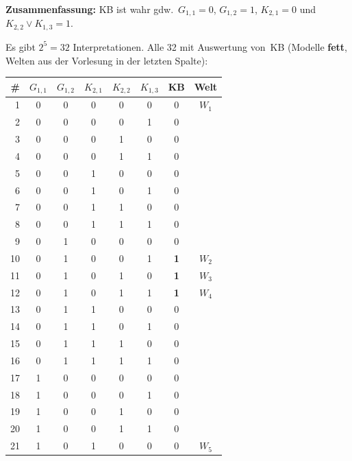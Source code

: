 \documentclass[a4paper,12pt]{article}
\begin{document}
\textbf{Zusammenfassung:} KB ist wahr gdw.\
$G_{1,1}=0$, $G_{1,2}=1$, $K_{2,1}=0$ und $K_{2,2} \vee K_{1,3} = 1$.

\newpage

\noindent{}

\bigskip
Es gibt $2^5 = 32$ Interpretationen.
Alle 32 mit Auswertung von~KB
(Modelle \textbf{fett}, Welten aus der Vorlesung in der letzten Spalte):

\begin{center}
\small
\renewcommand{\arraystretch}{1.05}
\begin{tabular}{r|ccccc|c|c}
\toprule
\# & $G_{1,1}$ & $G_{1,2}$ & $K_{2,1}$ & $K_{2,2}$ & $K_{1,3}$
   & KB & Welt \\
\midrule
1  & 0 & 0 & 0 & 0 & 0 & 0 & $W_1$ \\
2  & 0 & 0 & 0 & 0 & 1 & 0 & \\
3  & 0 & 0 & 0 & 1 & 0 & 0 & \\
4  & 0 & 0 & 0 & 1 & 1 & 0 & \\
5  & 0 & 0 & 1 & 0 & 0 & 0 & \\
6  & 0 & 0 & 1 & 0 & 1 & 0 & \\
7  & 0 & 0 & 1 & 1 & 0 & 0 & \\
8  & 0 & 0 & 1 & 1 & 1 & 0 & \\
\midrule
9  & 0 & 1 & 0 & 0 & 0 & 0 & \\
10 & 0 & 1 & 0 & 0 & 1 & \textbf{1} & $W_2$ \\
11 & 0 & 1 & 0 & 1 & 0 & \textbf{1} & $W_3$ \\
12 & 0 & 1 & 0 & 1 & 1 & \textbf{1} & $W_4$ \\
13 & 0 & 1 & 1 & 0 & 0 & 0 & \\
14 & 0 & 1 & 1 & 0 & 1 & 0 & \\
15 & 0 & 1 & 1 & 1 & 0 & 0 & \\
16 & 0 & 1 & 1 & 1 & 1 & 0 & \\
\midrule
17 & 1 & 0 & 0 & 0 & 0 & 0 & \\
18 & 1 & 0 & 0 & 0 & 1 & 0 & \\
19 & 1 & 0 & 0 & 1 & 0 & 0 & \\
20 & 1 & 0 & 0 & 1 & 1 & 0 & \\
21 & 1 & 0 & 1 & 0 & 0 & 0 & $W_5$ \\

\end{tabular}
\end{center}
\end{document}
